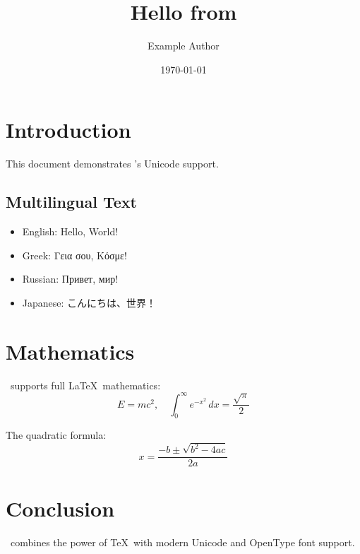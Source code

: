 \documentclass{article}
\begin{document}
\title{Hello from \XeTeX}
\author{Example Author}
\date{\today}
\maketitle

\section{Introduction}
This document demonstrates \XeTeX's Unicode support.

\subsection{Multilingual Text}
\begin{itemize}
  \item English: Hello, World!
  \item Greek: \textrm{Γεια σου, Κόσμε!}
  \item Russian: \textrm{Привет, мир!}
  \item Japanese: \textrm{こんにちは、世界！}
\end{itemize}

\section{Mathematics}
\XeTeX\ supports full \LaTeX\ mathematics:
\[
  E = mc^2, \quad
  \int_0^\infty e^{-x^2}\,dx = \frac{\sqrt{\pi}}{2}
\]

The quadratic formula:
\[
  x = \frac{-b \pm \sqrt{b^2 - 4ac}}{2a}
\]

\section{Conclusion}
\XeTeX\ combines the power of \TeX\ with modern Unicode and OpenType font support.
\end{document}
